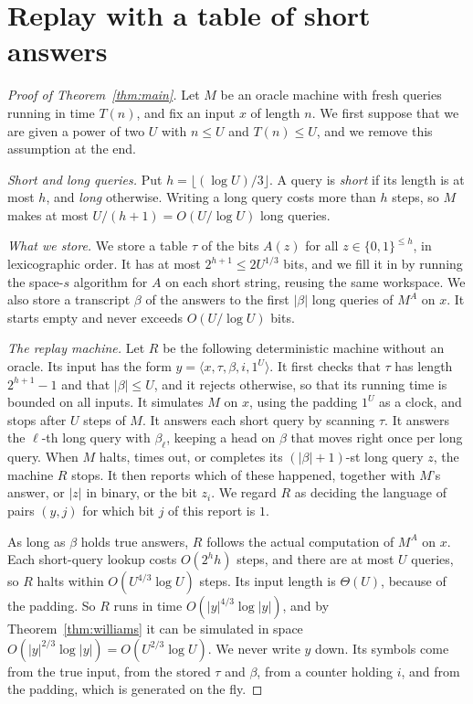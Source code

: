 \documentclass[11pt]{article}
\theoremstyle{remark}
\begin{document}
\section{Replay with a table of short answers}
\begin{proof}[Proof of Theorem~\ref{thm:main}]
Let $M$ be an oracle machine with fresh queries running in time $T(n)$,
and fix an input $x$ of length $n$. We first suppose that we are given a
power of two $U$ with $n\le U$ and $T(n)\le U$, and we remove this
assumption at the end.

\emph{Short and long queries.}
Put $h=\lfloor(\log U)/3\rfloor$. A query is \emph{short} if its length is
at most $h$, and \emph{long} otherwise. Writing a long query costs more
than $h$ steps, so $M$ makes at most $U/(h+1)=O(U/\log U)$ long queries.

\emph{What we store.}
We store a table $\tau$ of the bits $A(z)$ for all $z\in\{0,1\}^{\le h}$,
in lexicographic order. It has at most $2^{h+1}\le2U^{1/3}$ bits, and we
fill it in by running the space-$s$ algorithm for $A$ on each short
string, reusing the same workspace. We also store a transcript $\beta$
of the answers to the first $|\beta|$ long queries of $M^A$ on $x$. It
starts empty and never exceeds $O(U/\log U)$ bits.

\emph{The replay machine.}
Let $R$ be the following deterministic machine without an oracle. Its
input has the form $y=\langle x,\tau,\beta,i,1^U\rangle$. It first checks
that $\tau$ has length $2^{h+1}-1$ and that $|\beta|\le U$, and it rejects
otherwise, so that its running time is bounded on all inputs. It simulates $M$
on $x$, using the padding $1^U$ as a clock, and stops after $U$ steps of
$M$. It answers each short query by scanning $\tau$. It answers the
$\ell$-th long query with $\beta_\ell$, keeping a head on $\beta$ that
moves right once per long query. When $M$ halts, times out, or completes
its $(|\beta|+1)$-st long query $z$, the machine $R$ stops. It then reports
which of these happened, together with $M$'s answer, or $|z|$ in binary,
or the bit $z_i$. We regard $R$ as deciding the language of pairs
$(y,j)$ for which bit $j$ of this report is $1$.

As long as $\beta$ holds true answers, $R$ follows the actual
computation of $M^A$ on $x$. Each short-query lookup costs
$O(2^hh)$ steps, and there are at most $U$ queries, so $R$ halts within
$O(U^{4/3}\log U)$ steps. Its input length is $\Theta(U)$, because of the
padding. So $R$ runs in time $O(|y|^{4/3}\log|y|)$, and by
Theorem~\ref{thm:williams} it can be simulated in space
$O(|y|^{2/3}\log|y|)=O(U^{2/3}\log U)$. We never write $y$ down. Its
symbols come from the true input, from the stored $\tau$ and $\beta$, from
a counter holding $i$, and from the padding, which is generated on the
fly.


\end{proof}
\end{document}
